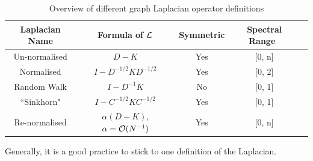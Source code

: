 \begin{table}[!htbp]
 \centering
 \begin{tabular}{|c|c|c|c|c|}
  \hline
  Laplacian Name & Formula of \(\operatorname{\mathcal{L}}\) & Symmetric & Spectral Range \\
  \hline
  Un-normalised & \(D - K\) & Yes & [0, n] \\
  \hline
  Normalised & \(I - D^{-1/2}KD^{-1/2}\) & Yes & [0, 2] \\
  \hline
  Random Walk & \(I - D^{-1}K\) & No & [0, 1] \\
  \hline
  ``Sinkhorn" \cite{milanfar_symmetrizing_2013} & \(I - C^{-1/2}KC^{-1/2}\) & Yes & [0, 1] \\
  \hline
  Re-normalised \cite{milanfar_new_2016} & \(\alpha(D - K)\), \(\alpha = \operatorname{\mathcal{O}}(N^{-1})\) & Yes & [0, n] \\
  \hline
 \end{tabular}
 \caption{Overview of different graph Laplacian operator definitions}
 \label{table:laplacians}
\end{table}
Generally, it is a good practice to stick to one definition of the Laplacian.
